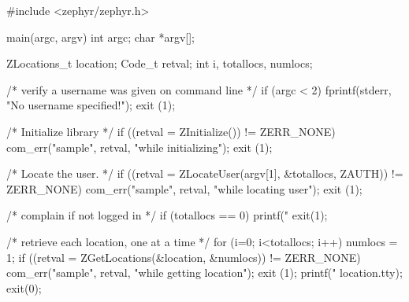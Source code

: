 \begin{code}
#include <zephyr/zephyr.h>

main(argc, argv)
    int argc;
    char *argv[];
{
    ZLocations_t location;
    Code_t retval;
    int i, totallocs, numlocs;

    /* verify a username was given on command line */
    if (argc < 2) {
        fprintf(stderr, "No username specified!\n");
        exit (1);
    }

    /* Initialize library */
    if ((retval = ZInitialize()) != ZERR_NONE) {
        com_err("sample", retval, "while initializing");
        exit (1);
    }

    /* Locate the user. */
    if ((retval = ZLocateUser(argv[1], &totallocs, ZAUTH)) != ZERR_NONE) {
        com_err("sample", retval, "while locating user");
        exit (1);
    }

    /* complain if not logged in */
    if (totallocs == 0) {
        printf("%
        exit(1);
    }

    /* retrieve each location, one at a time */
    for (i=0; i<totallocs; i++) {
        numlocs = 1;
        if ((retval = ZGetLocations(&location, &numlocs)) != ZERR_NONE) {
            com_err("sample", retval, "while getting location");
            exit (1);
        }
        printf("%
            location.tty);
    }
    exit(0);
}
\end{code}
